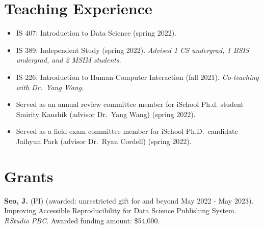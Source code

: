 \documentclass[11pt,a4paper,]{awesome-cv}
\begin{document}
\begin{cventries}
\end{cventries}

\hypertarget{teaching-experience}{%
  \section{Teaching Experience}\label{teaching-experience}}

\begin{itemize}
  \item
        IS 407: Introduction to Data Science (spring 2022).
  \item
        IS 389: Independent Study (spring 2022). \emph{Advised 1 CS undergrad,
          1 BSIS undergrad, and 2 MSIM students}.
  \item
        IS 226: Introduction to Human-Computer Interaction (fall 2021).
        \emph{Co-teaching with Dr.~Yang Wang}.
  \item
        Served as an annual review committee member for iSchool Ph.d. student
        Smirity Kaushik (advisor Dr.~Yang Wang) (spring 2022).
  \item
        Served as a field exam committee member for iSchool Ph.D.~candidate
        Jaihyun Park (advisor Dr.~Ryan Cordell) (spring 2022).
\end{itemize}

\hypertarget{grants}{%
  \section{Grants}\label{grants}}

\textbf{Seo, J.} (PI) (awarded: unrestricted gift for and beyond May 2022 - May 2023). Improving
Accessible Reproducibility for Data Science Publishing System.
\emph{RStudio PBC}. Awarded funding amount: \$54,000.
\end{document}
